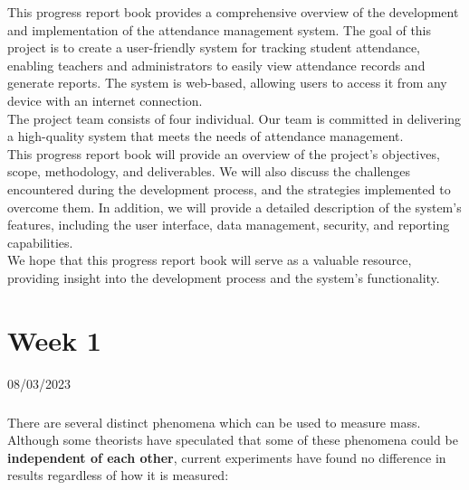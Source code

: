 \documentclass[12pt]{book}
\begin{document}
    \begin{flushleft}
    	This progress report book provides a comprehensive overview of the development and implementation of the attendance management system. The goal of this project is to create a user-friendly system for tracking student attendance, enabling teachers and administrators to easily view attendance records and generate reports. The system is web-based, allowing users to access it from any device with an internet connection. \\[6pt]
    	
    	The project team consists of four individual. Our team is committed in delivering a high-quality system that meets the needs of attendance management. \\[6pt]
    	
    	This progress report book will provide an overview of the project's objectives, scope, methodology, and deliverables. We will also discuss the challenges encountered during the development process, and the strategies implemented to overcome them. In addition, we will provide a detailed description of the system's features, including the user interface, data management, security, and reporting capabilities. \\[6pt]
    	
    	We hope that this progress report book will serve as a valuable resource, providing insight into the development process and the system's functionality.
    \end{flushleft}
    
    
    
    \tableofcontents


    \chapter{Week 1}
    \justifying
    \large
    08/03/2023 \\[10pt]
    
    
    \setcounter{page}{1}
    	
    \paragraph{}
    There are several distinct phenomena which can be used to measure mass. Although some theorists have speculated that some of these phenomena could be \textbf{independent of each other}, current experiments have found no difference in results regardless of how it is measured:
    
\end{document}
